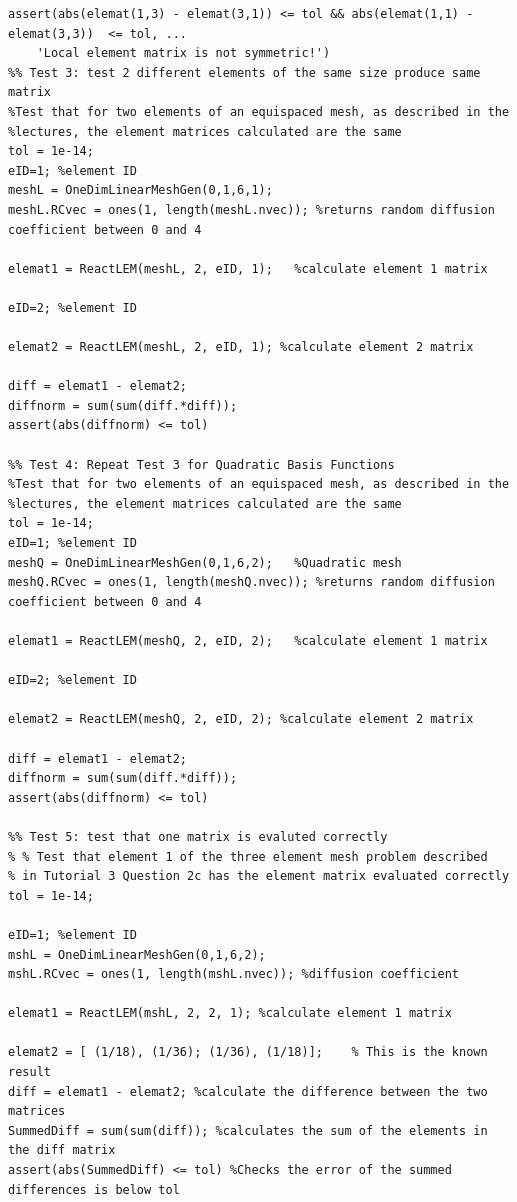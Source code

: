 \documentclass[11pt]{article}
\begin{document}
\begin{appendices}
\begin{lstlisting}
assert(abs(elemat(1,3) - elemat(3,1)) <= tol && abs(elemat(1,1) - elemat(3,3))  <= tol, ...
    'Local element matrix is not symmetric!')
%% Test 3: test 2 different elements of the same size produce same matrix
%Test that for two elements of an equispaced mesh, as described in the
%lectures, the element matrices calculated are the same
tol = 1e-14;
eID=1; %element ID
meshL = OneDimLinearMeshGen(0,1,6,1);
meshL.RCvec = ones(1, length(meshL.nvec)); %returns random diffusion coefficient between 0 and 4

elemat1 = ReactLEM(meshL, 2, eID, 1);	%calculate element 1 matrix

eID=2; %element ID

elemat2 = ReactLEM(meshL, 2, eID, 1); %calculate element 2 matrix

diff = elemat1 - elemat2;
diffnorm = sum(sum(diff.*diff));
assert(abs(diffnorm) <= tol)

%% Test 4: Repeat Test 3 for Quadratic Basis Functions
%Test that for two elements of an equispaced mesh, as described in the
%lectures, the element matrices calculated are the same
tol = 1e-14;
eID=1; %element ID
meshQ = OneDimLinearMeshGen(0,1,6,2);   %Quadratic mesh
meshQ.RCvec = ones(1, length(meshQ.nvec)); %returns random diffusion coefficient between 0 and 4

elemat1 = ReactLEM(meshQ, 2, eID, 2);	%calculate element 1 matrix

eID=2; %element ID

elemat2 = ReactLEM(meshQ, 2, eID, 2); %calculate element 2 matrix

diff = elemat1 - elemat2;
diffnorm = sum(sum(diff.*diff));
assert(abs(diffnorm) <= tol)

%% Test 5: test that one matrix is evaluted correctly
% % Test that element 1 of the three element mesh problem described 
% in Tutorial 3 Question 2c has the element matrix evaluated correctly
tol = 1e-14;

eID=1; %element ID
mshL = OneDimLinearMeshGen(0,1,6,2);
mshL.RCvec = ones(1, length(mshL.nvec)); %diffusion coefficient

elemat1 = ReactLEM(mshL, 2, 2, 1); %calculate element 1 matrix

elemat2 = [ (1/18), (1/36); (1/36), (1/18)];    % This is the known result
diff = elemat1 - elemat2; %calculate the difference between the two matrices
SummedDiff = sum(sum(diff)); %calculates the sum of the elements in the diff matrix
assert(abs(SummedDiff) <= tol) %Checks the error of the summed differences is below tol


\end{lstlisting}
\end{appendices}
\end{document}
